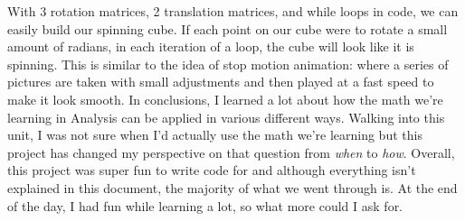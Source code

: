 \documentclass[14pt]{article}
\begin{document}
\vspace{-2mm}

\hspace{10mm}

With 3 rotation matrices, 2 translation matrices, and while loops in code, we can easily build our spinning cube. If each point on our cube were to rotate a small amount of radians, in each iteration of a loop, the cube will look like it is spinning. This is similar to the idea of stop motion animation: where a series of pictures are taken with small adjustments and then played at a fast speed to make it look smooth. In conclusions, I learned a lot about how the math we're learning in Analysis can be applied in various different ways. Walking into this unit, I was not sure when I'd actually use the math we're learning but this project has changed my perspective on that question from \textit{when} to \textit{how}. Overall, this project was super fun to write code for and although everything isn't explained in this document, the majority of what we went through is. At the end of the day, I had fun while learning a lot, so what more could I ask for.
\end{document}
